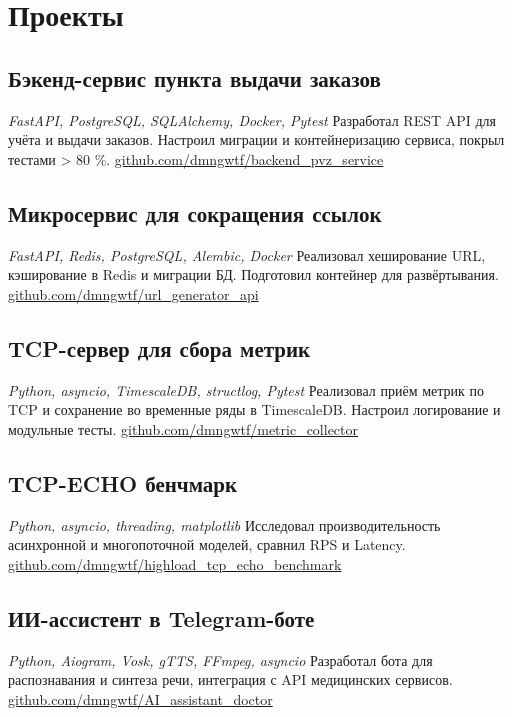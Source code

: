 \documentclass[a4paper,11pt]{article}
\begin{document}
	\section*{Проекты}
	
	\subsection*{Бэкенд-сервис пункта выдачи заказов}
	\textit{FastAPI, PostgreSQL, SQLAlchemy, Docker, Pytest}  
	Разработал REST API для учёта и выдачи заказов. Настроил миграции и контейнеризацию сервиса, покрыл тестами > 80 \%.  
	\href{https://github.com/dmngwtf/backend_pvz_service}{github.com/dmngwtf/backend\_pvz\_service}
	
	\subsection*{Микросервис для сокращения ссылок}
	\textit{FastAPI, Redis, PostgreSQL, Alembic, Docker}  
	Реализовал хеширование URL, кэширование в Redis и миграции БД. Подготовил контейнер для развёртывания.  
	\href{https://github.com/dmngwtf/url_generator_api}{github.com/dmngwtf/url\_generator\_api}
	
	\subsection*{TCP-сервер для сбора метрик}
	\textit{Python, asyncio, TimescaleDB, structlog, Pytest}  
	Реализовал приём метрик по TCP и сохранение во временные ряды в TimescaleDB. Настроил логирование и модульные тесты.  
	\href{https://github.com/dmngwtf/metric_collector}{github.com/dmngwtf/metric\_collector}
	
	\subsection*{TCP-ECHO бенчмарк}
	\textit{Python, asyncio, threading, matplotlib}  
	Исследовал производительность асинхронной и многопоточной моделей, сравнил RPS и Latency.  
	\href{https://github.com/dmngwtf/highload_tcp_echo_server_benchmark}{github.com/dmngwtf/highload\_tcp\_echo\_benchmark}
	
	\subsection*{ИИ-ассистент в Telegram-боте}
	\textit{Python, Aiogram, Vosk, gTTS, FFmpeg, asyncio}  
	Разработал бота для распознавания и синтеза речи, интеграция с API медицинских сервисов.  
	\href{https://github.com/dmngwtf/AI_assistant_doctor}{github.com/dmngwtf/AI\_assistant\_doctor}
	
\end{document}
